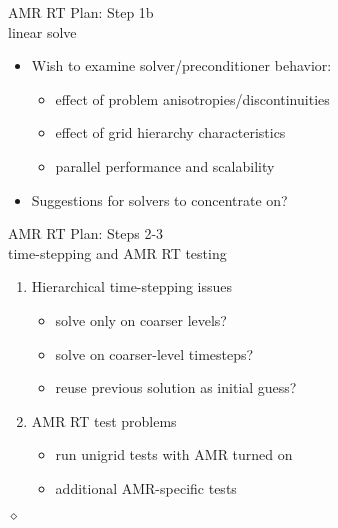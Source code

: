 \documentclass[slideColor,colorBG,nototal,blends,pdf]{prosper}
\begin{document}
\begin{slide}{\large AMR RT Plan: Step 1b\\
              \normalsize  linear solve}
\small

\begin{itemize}
\item Wish to examine solver/preconditioner behavior:
\begin{itemize}
\item effect of problem anisotropies/discontinuities
\item effect of grid hierarchy characteristics
\item parallel performance and scalability
\end{itemize}
\item Suggestions for solvers to concentrate on?
\end{itemize}
\end{slide}

\begin{slide}{\large AMR RT Plan: Steps 2-3\\
              \normalsize  time-stepping and AMR RT testing}
\small
\begin{enumerate}
\item[2.] Hierarchical time-stepping issues
\begin{itemize}
\item solve only on coarser levels?
\item solve on coarser-level timesteps?
\item reuse previous solution as initial guess?
\end{itemize}
\item[3.] AMR RT test problems
\begin{itemize}
\item run unigrid tests with AMR turned on
\item additional AMR-specific tests
\end{itemize}
\end{enumerate}
\centerline{$\diamond$}
\end{slide}
\end{document}
